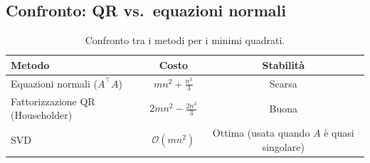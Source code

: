 \subsection{Confronto: QR vs.\ equazioni normali}

\begin{table}[htbp]
  \centering
  \caption{Confronto tra i metodi per i minimi quadrati.}
  \label{tab:mq_confronto}
  \begin{tabular}{lcc}
    \toprule
    \textbf{Metodo} & \textbf{Costo} & \textbf{Stabilità} \\
    \midrule
    Equazioni normali ($A^\top A$) & $mn^2 + \frac{n^3}{3}$ & Scarsa \\
    Fattorizzazione QR (Householder) & $2mn^2 - \frac{2n^3}{3}$ & Buona \\
    SVD                              & $\mathcal{O}(mn^2)$ & Ottima (usata quando $A$ è quasi singolare) \\
    \bottomrule
  \end{tabular}
\end{table}
